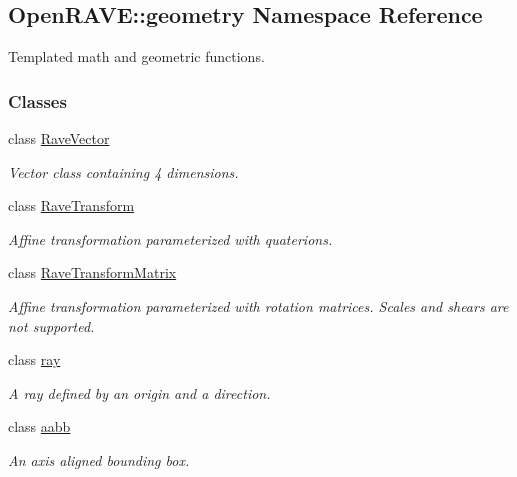 \hypertarget{namespaceOpenRAVE_1_1geometry}{
\subsection{OpenRAVE::geometry Namespace Reference}
\label{namespaceOpenRAVE_1_1geometry}
}


Templated math and geometric functions.  


\subsubsection*{Classes}
\begin{DoxyCompactItemize}
\item 
class \hyperlink{classOpenRAVE_1_1geometry_1_1RaveVector}{RaveVector}
\begin{DoxyCompactList}\small\item\em Vector class containing 4 dimensions. \item\end{DoxyCompactList}\item 
class \hyperlink{classOpenRAVE_1_1geometry_1_1RaveTransform}{RaveTransform}
\begin{DoxyCompactList}\small\item\em Affine transformation parameterized with quaterions. \item\end{DoxyCompactList}\item 
class \hyperlink{classOpenRAVE_1_1geometry_1_1RaveTransformMatrix}{RaveTransformMatrix}
\begin{DoxyCompactList}\small\item\em Affine transformation parameterized with rotation matrices. Scales and shears are not supported. \item\end{DoxyCompactList}\item 
class \hyperlink{classOpenRAVE_1_1geometry_1_1ray}{ray}
\begin{DoxyCompactList}\small\item\em A ray defined by an origin and a direction. \item\end{DoxyCompactList}\item 
class \hyperlink{classOpenRAVE_1_1geometry_1_1aabb}{aabb}
\begin{DoxyCompactList}\small\item\em An axis aligned bounding box. \item\end{DoxyCompactList}\item 

\end{DoxyCompactItemize}
